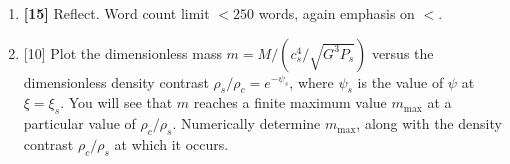 \documentclass{article}
\begin{document}
\begin{enumerate}
\item \textbf{[15]} Reflect.  Word count limit $<250$ words, again emphasis on $<$.


\item {[10]} Plot the dimensionless mass $m = M/(c_s^4/\sqrt{G^3 P_s})$ versus the dimensionless density contrast $\rho_s/\rho_c=e^{-\psi_s}$, where $\psi_s$ is the value of $\psi$ at $\xi=\xi_s$. You will see that $m$ reaches a finite maximum value $m_{\mathrm{max}}$ at a particular value of $\rho_c/\rho_s$. Numerically determine $m_{\mathrm{max}}$, along with the density contrast $\rho_c/\rho_s$ at which it occurs.
\label{item:maxmass}

% 
% 
% 

\end{enumerate}
\end{document}
